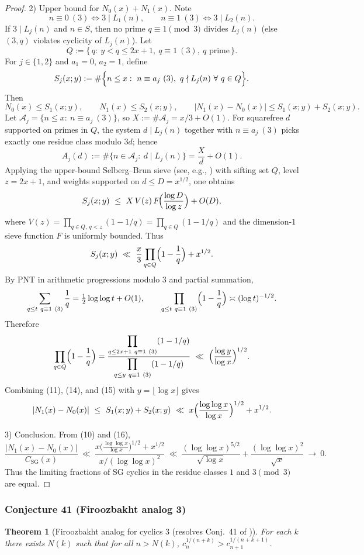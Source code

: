 \documentclass[12pt]{article}
\renewcommand{\tag}[1]{}
\newtheorem{theorem}{Theorem}
\theoremstyle{remark}
\begin{document}
\begin{proof}
2) Upper bound for $N_0(x)+N_1(x)$. Note
$$n\equiv0\ (3)\iff 3\mid L_1(n),\qquad n\equiv1\ (3)\iff 3\mid L_2(n).$$
If $3\mid L_j(n)$ and $n\in S$, then no prime $q\equiv1\pmod3$ divides $L_j(n)$ (else $(3,q)$ violates cyclicity of $L_j(n)$). Let
$$Q:=\{\,q:\ y<q\le 2x+1,\ q\equiv1\ (3),\ q\text{ prime}\,\}.$$
For $j\in\{1,2\}$ and $a_1=0$, $a_2=1$, define
$$S_j(x;y):=\#\Bigl\{n\le x:\ n\equiv a_j\ (3),\ q\nmid L_j(n)\ \forall\ q\in Q\Bigr\}.$$
Then
$$N_0(x)\le S_1(x;y),\qquad N_1(x)\le S_2(x;y),\qquad |N_1(x)-N_0(x)|\le S_1(x;y)+S_2(x;y).\tag{11}$$
Let $\mathcal A_j=\{n\le x:\ n\equiv a_j\ (3)\}$, so $X:=\#\mathcal A_j=x/3+O(1)$. For squarefree $d$ supported on primes in $Q$, the system $d\mid L_j(n)$ together with $n\equiv a_j\ (3)$ picks exactly one residue class modulo $3d$; hence
$$A_j(d):=\#\{n\in\mathcal A_j:\ d\mid L_j(n)\}=\frac{X}{d}+O(1).\tag{12}$$
Applying the upper-bound Selberg--Brun sieve (see, e.g., \cite{HalRich1974,IK2004}) with sifting set $Q$, level $z=2x+1$, and weights supported on $d\le D=x^{1/2}$, one obtains
$$S_j(x;y)\ \le\ X\,V(z)\,F\!\Bigl(\frac{\log D}{\log z}\Bigr)+O(D),\tag{13}$$
where $V(z)=\prod_{q\in Q,\ q<z}(1-1/q)=\prod_{q\in Q}(1-1/q)$ and the dimension-$1$ sieve function $F$ is uniformly bounded. Thus
$$S_j(x;y)\ \ll\ \frac{x}{3}\prod_{q\in Q}\Bigl(1-\frac1q\Bigr)+x^{1/2}.\tag{14}$$
By PNT in arithmetic progressions modulo $3$ and partial summation,
$$\sum_{\substack{q\le t\ q\equiv1\ (3)}}\frac1q=\tfrac12\log\log t+O(1),\qquad \prod_{\substack{q\le t\ q\equiv1\ (3)}}\Bigl(1-\frac1q\Bigr)\asymp (\log t)^{-1/2}.$$
Therefore
$$\prod_{q\in Q}\Bigl(1-\frac1q\Bigr)=\frac{\displaystyle\prod_{\substack{q\le 2x+1\ q\equiv1\ (3)}}(1-1/q)}{\displaystyle\prod_{\substack{q\le y\ q\equiv1\ (3)}}(1-1/q)}\ \ll\ \Bigl(\frac{\log y}{\log x}\Bigr)^{1/2}.\tag{15}$$
Combining (11), (14), and (15) with $y=\lfloor\log x\rfloor$ gives
$$|N_1(x)-N_0(x)|\ \le\ S_1(x;y)+S_2(x;y)\ \ll\ x\Bigl(\frac{\log\log x}{\log x}\Bigr)^{1/2}+x^{1/2}.\tag{16}$$

3) Conclusion. From (10) and (16),
$$\frac{|N_1(x)-N_0(x)|}{C_{\mathrm{SG}}(x)}\ \ll\ \frac{x\bigl(\tfrac{\log\log x}{\log x}\bigr)^{1/2}+x^{1/2}}{x/(\log\log x)^2}\ \ll\ \frac{(\log\log x)^{5/2}}{\sqrt{\log x}}+\frac{(\log\log x)^2}{\sqrt{x}}\ \to\ 0.$$
Thus the limiting fractions of SG cyclics in the residue classes $1$ and $3\pmod3$ are equal. 
\end{proof}


\subsubsection{Conjecture 41 (Firoozbakht analog 3)}
\begin{theorem}[Firoozbakht analog for cyclics 3 (resolves Conj.~41 of \cite{Cohen2025})]\label{thm:firoozbakht_cyclics_3}
For each \(k\) there exists \(N(k)\) such that for all \(n>N(k)\), \(c_n^{1/(n+k)}>c_{n+1}^{1/(n+k+1)}\).
\end{theorem}
\end{document}
